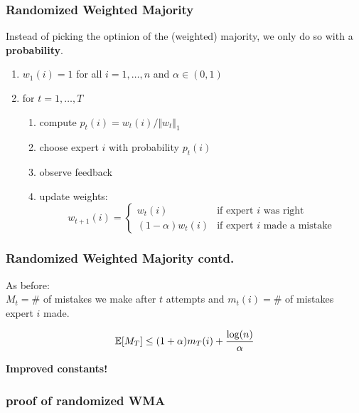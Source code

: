 \documentclass{beamer}
\begin{document}
\begin{frame}
  \frametitle{Randomized Weighted Majority}

  Instead of picking the optinion of the (weighted) majority, we only do so with a \textbf{probability}.

  \begin{enumerate}
    \item $w_1(i) = 1$ for all $i = 1, \dots, n$ and $\alpha \in (0, 1)$
    \item for $t=1, \dots, T$
      \begin{enumerate}
      \item compute $p_t(i) = w_t(i)/\Vert w_t \Vert_1$
      \item choose expert $i$ with probability $p_t(i)$
      \item observe feedback
      \item update weights:
        \begin{equation}
          w_{t+1}(i) = \begin{cases}
              w_t(i) & \text{if expert $i$ was right} \\
              (1-\alpha)w_t(i) & \text{if expert $i$ made a mistake}
          \end{cases}
        \end{equation}

      \end{enumerate}
  \end{enumerate}

\end{frame}


\begin{frame}
  \frametitle{Randomized Weighted Majority contd.}
  As before:\\
    $M_t= \#$ of mistakes we make after $t$ attempts and
    $m_t(i) = \#$ of mistakes expert $i$ made.
    \begin{theorem}
      \begin{equation}
        \mathbb{E}[M_T] \le (1+\alpha)m_T(i) + \frac{\log(n)}{\alpha}
      \end{equation}
    \end{theorem}
    \textbf{Improved constants!}
\end{frame}

\begin{frame}
  \frametitle{proof of randomized WMA}

\end{frame}
\end{document}
